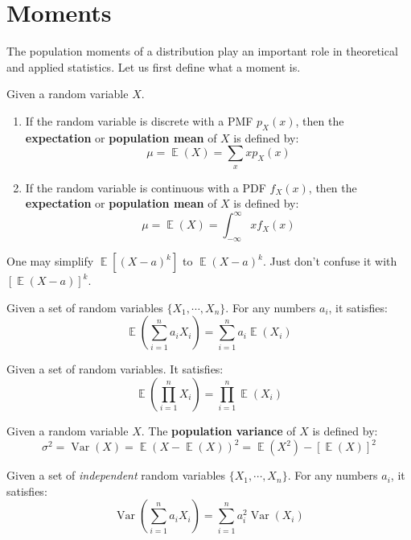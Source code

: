 \documentclass{huhtakm-template-book-v2}
\DeclareMathOperator{\E}{\mathbb{E}}
\DeclareMathOperator{\Var}{Var}
\begin{document}
\section{Moments}
The population moments of a distribution play an important role in theoretical and applied statistics. Let us first define what a moment is.
\begin{defn}
	Given a random variable $X$.
	\begin{enumerate}
		\item If the random variable is discrete with a PMF $p_{X}(x)$, then the \textbf{expectation} or \textbf{population mean} of $X$ is defined by:
		\begin{equation*}
			\mu=\E(X)=\sum_{x}xp_{X}(x)
		\end{equation*}
		\item If the random variable is continuous with a PDF $f_{X}(x)$, then the \textbf{expectation} or \textbf{population mean} of $X$ is defined by:
		\begin{equation*}
			\mu=\E(X)=\int_{-\infty}^{\infty}xf_{X}(x)
		\end{equation*}
	\end{enumerate}
\end{defn}
\begin{rem}
	One may simplify $\E[(X-a)^{k}]$ to $\E(X-a)^{k}$. Just don't confuse it with $[\E(X-a)]^{k}$.
\end{rem}
\begin{lem}
	Given a set of random variables $\{X_{1},\cdots,X_{n}\}$. For any numbers $a_{i}$, it satisfies:
	\begin{equation*}
		\E\left(\sum_{i=1}^{n}a_{i}X_{i}\right)=\sum_{i=1}^{n}a_{i}\E\left(X_{i}\right)
	\end{equation*}
\end{lem}
\begin{lem}
	Given a set of  random variables. It satisfies:
	\begin{equation*}
		\E\left(\prod_{i=1}^{n}X_{i}\right)=\prod_{i=1}^{n}\E(X_{i})
	\end{equation*}
\end{lem}
\begin{defn}
	Given a random variable $X$. The \textbf{population variance} of $X$ is defined by:
	\begin{equation*}
		\sigma^{2}=\Var(X)=\E(X-\E(X))^{2}=\E(X^{2})-[\E(X)]^{2}
	\end{equation*}
\end{defn}
\begin{lem}
	Given a set of \textit{independent} random variables $\{X_{1},\cdots,X_{n}\}$. For any numbers $a_{i}$, it satisfies:
	\begin{equation*}
		\Var\left(\sum_{i=1}^{n}a_{i}X_{i}\right)=\sum_{i=1}^{n}a_{i}^{2}\Var(X_{i})
	\end{equation*}
\end{lem}
\end{document}
